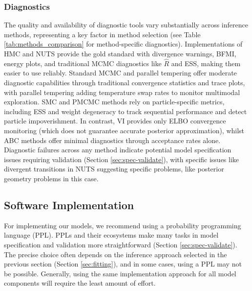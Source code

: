 \documentclass{article}
\begin{document}
\subsubsection{Diagnostics}

The quality and availability of diagnostic tools vary substantially across inference methods, representing a key factor in method selection (see Table \ref{tab:methods_comparison} for method-specific diagnostics).
Implementations of HMC and NUTS provide the gold standard with divergence warnings, \ac{BFMI}, energy plots, and traditional MCMC diagnostics like $\hat{R}$ and \ac{ESS}, making them easier to use reliably.
Standard MCMC and parallel tempering offer moderate diagnostic capabilities through traditional convergence statistics and trace plots, with parallel tempering adding temperature swap rates to monitor multimodal exploration.
SMC and PMCMC methods rely on particle-specific metrics, including \ac{ESS} and weight degeneracy to track sequential performance and detect particle impoverishment. 
In contrast, VI provides only \ac{ELBO} convergence monitoring (which does not guarantee accurate posterior approximation), whilst ABC methods offer minimal diagnostics through acceptance rates alone.
Diagnostic failures across any method indicate potential model specification issues requiring validation (Section \ref{sec:spec-validate}), with specific issues like divergent transitions in NUTS suggesting specific problems, like posterior geometry problems in this case.

\subsection{Software Implementation}\label{sec:implementation}

For implementing our models, we recommend using a probability programming language (PPL).
PPLs and their ecosystems make many tasks in model specification and validation more straightforward (Section \ref{sec:spec-validate}).
The precise choice often depends on the inference approach selected in the previous section (Section \ref{sec:fitting}), and in some cases, using a PPL may not be possible.
Generally, using the same implementation approach for all model components will require the least amount of effort.
\end{document}
